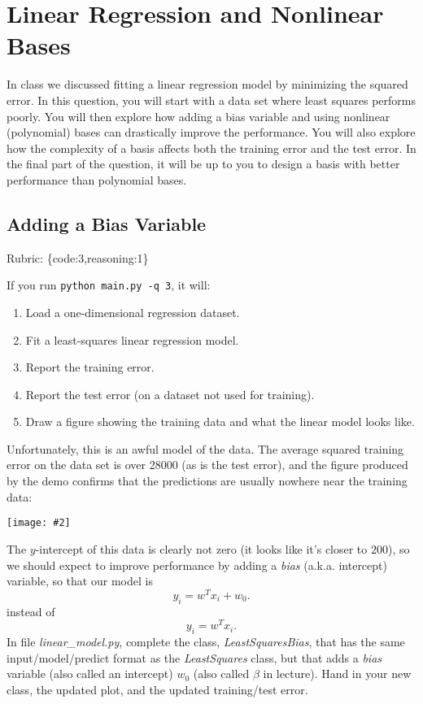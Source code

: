 \documentclass{article}
\def\rubric#1{\gre{Rubric: \{#1\}}}{}
\def\blu#1{{\color{blu}#1}}
\def\gre#1{{\color{gre}#1}}
\newcommand{\centerfig}[2]{\begin{center}\texttt{[image: \#2]}\end{center}}
\def\enum#1{\begin{enumerate}#1\end{enumerate}}
\begin{document}
\section{Linear Regression and Nonlinear Bases}

In class we discussed fitting a linear regression model by minimizing the squared error.
In this question, you will start with a data set where least squares performs poorly.
You will then explore how adding a bias variable and using nonlinear (polynomial) bases can drastically improve the performance.
You will also explore how the complexity of a basis affects both the training error and the test error.
In the final part of the question, it will be up to you to design a basis with better performance than polynomial bases.

\subsection{Adding a Bias Variable}
\rubric{code:3,reasoning:1}

If you run  \verb|python main.py -q 3|, it will:
\enum{
\item Load a one-dimensional regression dataset.
\item Fit a least-squares linear regression model.
\item Report the training error.
\item Report the test error (on a dataset not used for training).
\item Draw a figure showing the training data and what the linear model looks like.
}
Unfortunately, this is an awful model of the data. The average squared training error on the data set is over 28000
(as is the test error), and the figure produced by the demo confirms that the predictions are usually nowhere near
 the training data:

\centerfig{.5}{/Users/rachelsunderland/Desktop/a3_figs/figs/least_squares_no_bias.pdf}

The $y$-intercept of this data is clearly not zero (it looks like it's closer to $200$),
so we should expect to improve performance by adding a \emph{bias} (a.k.a. intercept) variable, so that our model is
\[
y_i = w^Tx_i + w_0.
\]
instead of
\[
y_i = w^Tx_i.
\]
\blu{In file \emph{linear\_model.py}, complete the class, \emph{LeastSquaresBias},
that has the same input/model/predict format as the \emph{LeastSquares} class,
but that adds a \emph{bias} variable (also called an intercept) $w_0$ (also called $\beta$ in lecture). Hand in your new class, the updated plot,
and the updated training/test error.}
\end{document}

